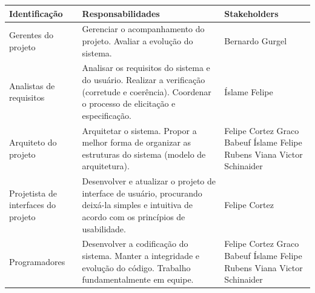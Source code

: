 \documentclass[12pt, a4paper]{article}
\begin{document}
        \begin{longtabu}{X | X[2] | X[-1]}
                \hline
                \textbf{Identificação} &
                \textbf{Responsabilidades} &
                \textbf{Stakeholders}
                \\ \hline

                Gerentes do projeto &
                Gerenciar o acompanhamento do projeto. Avaliar a evolução do
                sistema. &
                Bernardo Gurgel
                \\ \hline

                Analistas de requisitos &
                Analisar os requisitos do sistema e do usuário. Realizar a
                verificação (corretude e coerência). Coordenar o processo de
                elicitação e especificação. &
                Íslame Felipe
                \\ \hline

                Arquiteto do projeto &
                Arquitetar o sistema. Propor a melhor forma de organizar as
                estruturas do sistema (modelo de arquitetura). &
                Felipe Cortez \newline
                Graco Babeuf \newline
                Íslame Felipe \newline
                Rubens Viana \newline
                Victor Schinaider
                \\ \hline

                Projetista de interfaces do projeto &
                Desenvolver e atualizar o projeto de interface de usuário,
                procurando deixá-la simples e intuitiva de acordo com os
                princípios de usabilidade. &
                Felipe Cortez
                \\ \hline

                Programadores &
                Desenvolver a codificação do sistema. Manter a integridade e
                evolução do código. Trabalho fundamentalmente em equipe. &
                Felipe Cortez \newline
                Graco Babeuf \newline
                Íslame Felipe \newline
                Rubens Viana \newline
                Victor Schinaider
                \\ \hline


\end{longtabu}
\end{document}
